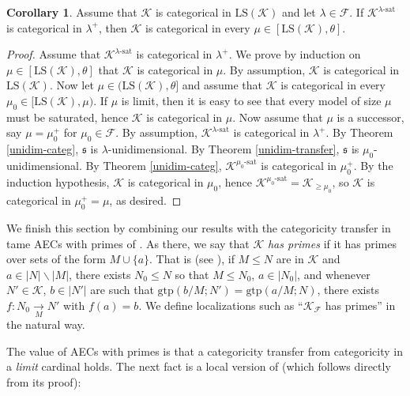 \documentclass[12pt]{amsart}
\theoremstyle{definition}
\newtheorem{cor}[mydef]{Corollary}
\begin{document}
\begin{cor}\label{good-categ-transfer}
  Assume that ${\mathcal{K}}$ is categorical in ${\text{LS}} ({\mathcal{K}})$ and let $\lambda \in {\mathcal{F}}$. If ${{{{\mathcal{K}}}^{{{\lambda}}\text{-sat}}}}$ is categorical in $\lambda^+$, then ${\mathcal{K}}$ is categorical in every $\mu \in [{\text{LS}} ({\mathcal{K}}), \theta]$.
\end{cor}
\begin{proof}
  Assume that ${{{{\mathcal{K}}}^{{{\lambda}}\text{-sat}}}}$ is categorical in $\lambda^+$. We prove by induction on $\mu \in [{\text{LS}} ({\mathcal{K}}), \theta]$ that ${\mathcal{K}}$ is categorical in $\mu$. By assumption, ${\mathcal{K}}$ is categorical in ${\text{LS}} ({\mathcal{K}})$. Now let $\mu \in ({\text{LS}} ({\mathcal{K}}), \theta]$ and assume that ${\mathcal{K}}$ is categorical in every $\mu_0 \in [{\text{LS}} ({\mathcal{K}}), \mu)$. If $\mu$ is limit, then it is easy to see that every model of size $\mu$ must be saturated, hence ${\mathcal{K}}$ is categorical in $\mu$. Now assume that $\mu$ is a successor, say $\mu = \mu_0^+$ for $\mu_0 \in {\mathcal{F}}$. By assumption, ${{{{\mathcal{K}}}^{{{\lambda}}\text{-sat}}}}$ is categorical in $\lambda^+$. By Theorem \ref{unidim-categ}, ${\mathfrak{s}}$ is $\lambda$-unidimensional. By Theorem \ref{unidim-transfer}, ${\mathfrak{s}}$ is $\mu_0$-unidimensional. By Theorem \ref{unidim-categ}, ${{{{\mathcal{K}}}^{{{\mu_0}}\text{-sat}}}}$ is categorical in $\mu_0^+$. By the induction hypothesis, ${\mathcal{K}}$ is categorical in $\mu_0$, hence ${{{{\mathcal{K}}}^{{{\mu_0}}\text{-sat}}}} = {\mathcal{K}}_{\ge \mu_0}$, so ${\mathcal{K}}$ is categorical in $\mu_0^+ = \mu$, as desired.
\end{proof}

We finish this section by combining our results with the categoricity transfer in tame AECs with primes of \cite{categ-primes-v3}. As there, we say that ${\mathcal{K}}$ \emph{has primes} if it has primes over sets of the form $M \cup \{a\}$. That is (see \cite[Section II.3]{shelahaecbook}), if $M {\le} N$ are in ${\mathcal{K}}$ and $a \in |N| \backslash |M|$, there exists $N_0 {\le} N$ so that $M {\le} N_0$, $a \in |N_0|$, and whenever $N' \in {\mathcal{K}}$, $b \in |N'|$ are such that ${\text{gtp}} (b / M; N') = {\text{gtp}} (a / M; N)$, there exists $f: N_0 \xrightarrow[M]{} N'$ with $f (a) = b$. We define localizations such as ``${\mathcal{K}}_{\mathcal{F}}$ has primes'' in the natural way.

The value of AECs with primes is that a categoricity transfer from categoricity in a \emph{limit} cardinal holds. The next fact is a local version of \cite[Theorem 2.16]{categ-primes-v3} (which follows directly from its proof):
\end{document}
